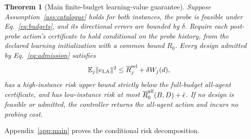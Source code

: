 \documentclass[journal]{IEEEtran}
\newtheorem{theorem}{Theorem}
\newcommand{\E}{\mathbb{E}}
\begin{document}
\begin{theorem}[Main finite-budget learning-value guarantee]
Suppose Assumption~\ref{ass:catalogue} holds for both instances, the probe is feasible under Eq.~\eqref{eq:budgets}, and its directional errors are bounded by $\delta$.
Require each post-probe action's certificate to hold conditional on the probe history, from the declared learning initialization with a common bound $R_0$.
Every design admitted by Eq.~\eqref{eq:admission} satisfies
\begin{equation}
\E_j\|e_{\rm LA}\|^2\le \overline R_j^{\rm sel}+\delta W_j(d),
\label{eq:main-risk}
\end{equation}
has a high-instance risk upper bound strictly below the full-budget all-agent certificate, and has low-instance risk at most $\overline R_0^{\rm all}(B,D)+\bar\epsilon$.
If no design is feasible or admitted, the controller returns the all-agent action and incurs no probing cost.
\label{thm:main}
\end{theorem}
Appendix~\ref{app:main} proves the conditional risk decomposition.
\end{document}
